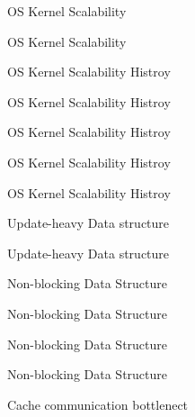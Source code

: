 \documentclass[english]{beamer} %
\begin{document}
\begin{frame}{OS Kernel Scalability}
\end{frame}


\begin{frame}{OS Kernel Scalability}
\end{frame}



\begin{frame}{OS Kernel Scalability Histroy}
\end{frame}


\begin{frame}{OS Kernel Scalability Histroy}
\end{frame}


\begin{frame}{OS Kernel Scalability Histroy}
\end{frame}


\begin{frame}{OS Kernel Scalability Histroy}
\end{frame}


\begin{frame}{OS Kernel Scalability Histroy}
\end{frame}



\begin{frame}{Update-heavy Data structure}
\end{frame}



\begin{frame}{Update-heavy Data structure}
\end{frame}

\begin{frame}{Non-blocking Data Structure}
\end{frame}


\begin{frame}{Non-blocking Data Structure}
\end{frame}


\begin{frame}{Non-blocking Data Structure}
\end{frame}


\begin{frame}{Non-blocking Data Structure}
\end{frame}


\begin{frame}{Cache communication bottlenect}
\end{frame}
\end{document}
